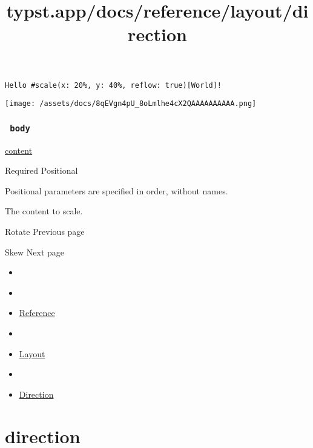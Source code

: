 \begin{verbatim}
Hello #scale(x: 20%, y: 40%, reflow: true)[World]!
\end{verbatim}

\texttt{[image: /assets/docs/8qEVgn4pU\_8oLmlhe4cX2QAAAAAAAAAA.png]}

\subsubsection{\texorpdfstring{\texttt{\ body\ }}{ body }}\label{parameters-body}

\href{/docs/reference/foundations/content/}{content}

{Required} {{ Positional }}

\label{parameters-body-positional-tooltip}
Positional parameters are specified in order, without names.

The content to scale.

\href{/docs/reference/layout/rotate/}{\pandocbounded{}}

{ Rotate } { Previous page }

\href{/docs/reference/layout/skew/}{\pandocbounded{}}

{ Skew } { Next page }


\title{typst.app/docs/reference/layout/direction}

\begin{itemize}
\tightlist
\item
  \href{/docs}{}
\item
  
\item
  \href{/docs/reference/}{Reference}
\item
  
\item
  \href{/docs/reference/layout/}{Layout}
\item
  
\item
  \href{/docs/reference/layout/direction/}{Direction}
\end{itemize}

\section{\texorpdfstring{{ direction }}{ direction }}\label{summary}

